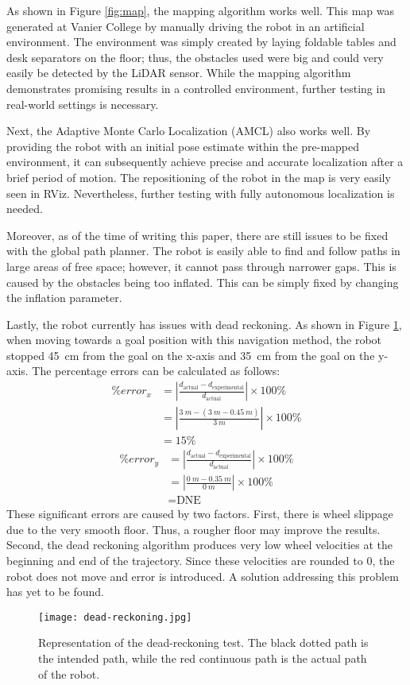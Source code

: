 As shown in Figure \ref{fig:map}, the mapping algorithm works well. This map was generated at Vanier College by manually driving the robot in an artificial environment. The environment was simply created by laying foldable tables and desk separators on the floor; thus, the obstacles used were big and could very easily be detected by the LiDAR sensor. While the mapping algorithm demonstrates promising results in a controlled environment, further testing in real-world settings is necessary.

Next, the Adaptive Monte Carlo Localization (AMCL) also works well. By providing the robot with an initial pose estimate within the pre-mapped environment, it can subsequently achieve precise and accurate localization after a brief period of motion. The repositioning of the robot in the map is very easily seen in RViz. Nevertheless, further testing with fully autonomous localization is needed.

Moreover, as of the time of writing this paper, there are still issues to be fixed with the global path planner. The robot is easily able to find and follow paths in large areas of free space; however, it cannot pass through narrower gaps. This is caused by the obstacles being too inflated. This can be simply fixed by changing the inflation parameter.

Lastly, the robot currently has issues with dead reckoning. As shown in Figure \ref{fig:dead-reckoning}, when moving towards a goal position with this navigation method, the robot stopped \qty{45}{cm} from the goal on the x-axis and \qty{35}{cm} from the goal on the y-axis. The percentage errors can be calculated as follows:
\begin{equation*}
    \begin{split}
        \% error_x & =\left|\frac{d_\text{actual}-d_\text{experimental}}{d_\text{actual}}\right|\times100\% \\
                   & =\left|\frac{\qty{3}{m}-(\qty{3}{m}-\qty{0.45}{m})}{\qty{3}{m}}\right|\times100\%      \\
                   & =15\%
    \end{split}
\end{equation*}
\begin{equation*}
    \begin{split}
        \% error_y & =\left|\frac{d_\text{actual}-d_\text{experimental}}{d_\text{actual}}\right|\times100\% \\
                   & =\left|\frac{\qty{0}{m}-\qty{0.35}{m}}{\qty{0}{m}}\right|\times100\%                   \\
                   & = \text{DNE}
    \end{split}
\end{equation*}
These significant errors are caused by two factors. First, there is wheel slippage due to the very smooth floor. Thus, a rougher floor may improve the results. Second, the dead reckoning algorithm produces very low wheel velocities at the beginning and end of the trajectory. Since these velocities are rounded to 0, the robot does not move and error is introduced. A solution addressing this problem has yet to be found.

\begin{figure}[!htb]
    \texttt{[image: dead-reckoning.jpg]}
    \centering
    \caption{Representation of the dead-reckoning test. The black dotted path is the intended path, while the red continuous path is the actual path of the robot.}
    \label{fig:dead-reckoning}
\end{figure}